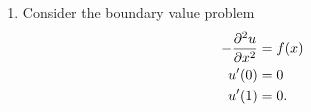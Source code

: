 \begin{enumerate}
\item Consider the boundary value problem
\begin{align*}
-\frac{\partial^2u}{\partial x^2} &= f(x)\\
u'(0) &= 0\\
u'(1) &= 0.
\end{align*}


\end{enumerate}

